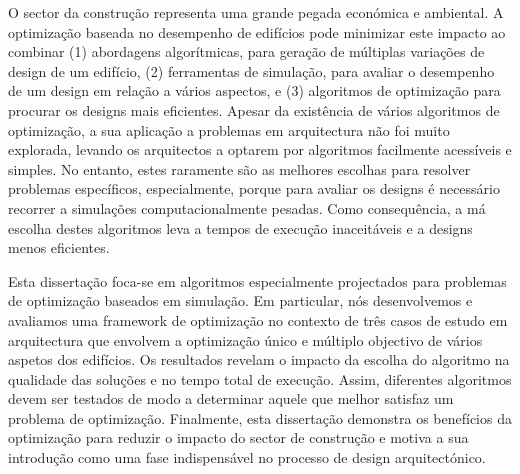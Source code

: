 \noindent 
O sector da construção representa uma grande pegada económica e ambiental. A optimização baseada no desempenho de edifícios pode minimizar este impacto ao combinar (1) abordagens algorítmicas, para geração de múltiplas variações de design de um edifício, (2) ferramentas de simulação, para avaliar o desempenho de um design em relação a vários aspectos, e (3) algoritmos de optimização para procurar os designs mais eficientes. Apesar da existência de vários algoritmos de optimização, a sua aplicação a problemas em arquitectura não foi muito explorada, levando os arquitectos a optarem por algoritmos facilmente acessíveis e simples. No entanto, estes raramente são as melhores escolhas para resolver problemas específicos, especialmente, porque para avaliar os designs é necessário recorrer a simulações computacionalmente pesadas. Como consequência, a má escolha destes algoritmos leva a tempos de execução inaceitáveis e a designs menos eficientes.

Esta dissertação foca-se em algoritmos especialmente projectados para problemas de optimização baseados em simulação. Em particular, nós desenvolvemos e avaliamos uma framework de optimização no contexto de três casos de estudo em arquitectura que envolvem a optimização único e múltiplo objectivo de vários aspetos dos edifícios. Os resultados revelam o impacto da escolha do algoritmo na qualidade das soluções e no tempo total de execução. Assim, diferentes algoritmos devem ser testados de modo a determinar aquele que melhor satisfaz um problema de optimização. Finalmente, esta dissertação demonstra os benefícios da optimização para reduzir o impacto do sector de construção e motiva a sua introdução como uma fase indispensável no processo de design arquitectónico.

